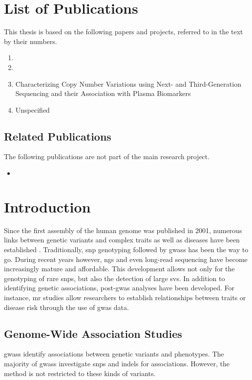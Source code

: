 \documentclass[twoside=false]{scrbook}
\begin{document}
\chapter{List of Publications}
This thesis is based on the following papers and projects, referred to in the text by their numbers.

\begin{enumerate}[label=\Roman*.]
    \item {}
    \item {}
    \item Characterizing Copy Number Variations using Next- and Third-Generation Sequencing and their Association with Plasma Biomarkers
    \item Unspecified
\end{enumerate}

\section*{Related Publications}
The following publications are not part of the main research project.
\begin{itemize}
    \item {}
\end{itemize}

\tableofcontents

\mainmatter
\glsresetall
\parskip 0pt
\parindent \oldparindent
\chapter{Introduction}
Since the first assembly of the human genome was published in 2001, numerous links between genetic variants and complex traits as well as diseases have been established \cite{Lander2001}.
Traditionally, \gls{snp} genotyping followed by \glspl{gwas} has been the way to go.
During recent years however, \gls{ngs} and even long-read sequencing have become increasingly mature and affordable.
This development allows not only for the genotyping of rare \glspl{snp}, but also the detection of large \glspl{sv}.
In addition to identifying genetic associations, post-\gls{gwas} analyses have been developed.
For instance, \gls{mr} studies allow researchers to establish relationships between traits or disease risk through the use of \gls{gwas} data.

\section{Genome-Wide Association Studies}
\Glspl{gwas} identify associations between genetic variants and phenotypes.
The majority of \glspl{gwas} investigate \glspl{snp} and \glspl{indel} for associations.
However, the method is not restricted to these kinds of variants.
\end{document}
